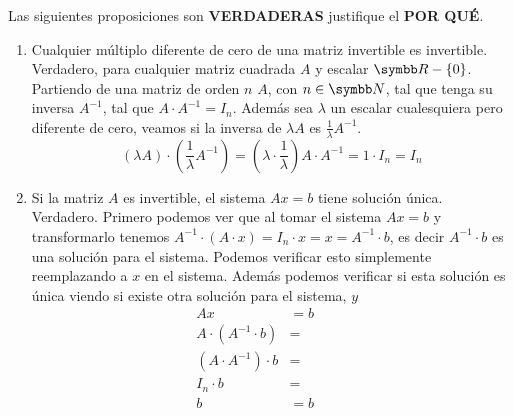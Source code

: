 \item Las siguientes proposiciones son \textbf{VERDADERAS} justifique el \textbf{POR QUÉ}.
    \begin{enumerate}[label=\listAlph]
        \item Cualquier múltiplo diferente de cero de una matriz invertible es invertible. \\
            Verdadero, para cualquier matriz cuadrada \(A\) y escalar \(\realR - \left\{0\right\}\). 
            Partiendo de una matriz de orden \(n\) \(A\), con \(n \in \realN\), tal que tenga su inversa \(A^{-1}\), 
            tal que \(A \cdot A^{-1} = I_n\). Además sea \(\lambda\) un escalar cualesquiera pero diferente de cero, veamos 
            si la inversa de \(\lambda A\) es \(\frac{1}{\lambda}A^{-1}\). 
            \[
                \left(\lambda A\right) \cdot \left(\frac{1}{\lambda} A^{-1}\right)
                = \left(\lambda \cdot \frac{1}{\lambda}\right) A \cdot A^{-1}
                = 1 \cdot I_n
                = I_n
            \]
        \setcounter{enumii}{3}
        \item Si la matriz \(A\) es invertible, el sistema \(Ax = b\) tiene solución única. \\
            Verdadero. Primero podemos ver que al tomar el sistema \(Ax = b\) y transformarlo tenemos \(A^{-1} \cdot (A \cdot x) = I_n \cdot x = x = A^{-1} \cdot b\), 
            es decir \(A^{-1} \cdot b\) es una solución para el sistema. Podemos verificar esto simplemente reemplazando a \(x\) en el sistema. Además podemos verificar si 
            esta solución es única viendo si existe otra solución para el sistema, \(y\)
            \[
                \begin{aligned}
                    Ax &= b \\
                    A \cdot (A^{-1} \cdot b) &= \\
                    (A \cdot A^{-1}) \cdot b &= \\
                    I_n \cdot b &= \\
                    b &= b\\
                \end{aligned}
                \hspace{1cm}
\]
\end{enumerate}
